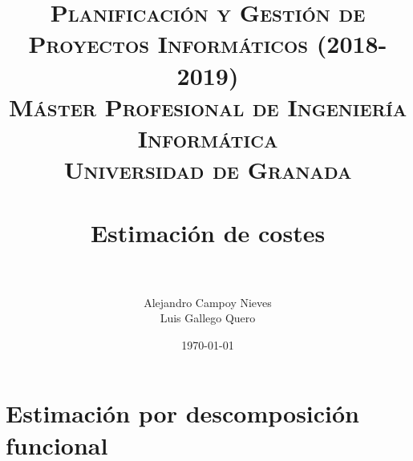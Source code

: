 


\title{	
	\normalfont \normalsize 
	\textsc{\textbf{Planificación y Gestión de Proyectos Informáticos (2018-2019)} \\ Máster Profesional de Ingeniería Informática \\ Universidad de Granada} \\ [25pt] %
	\horrule{0.5pt} \\[0.4cm] %
	\huge Estimación de costes \\ %
	\horrule{2pt} \\[0.5cm] %
}

\author{Alejandro Campoy Nieves \\ Luis Gallego Quero} %
\date{\normalsize\today} %
\usepackage{graphicx}
\usepackage{hyperref} %
\usepackage{eurosym} %




\maketitle %

\newpage %

\tableofcontents %

\listoffigures

\listoftables	

\newpage		
 
\section{Estimación por descomposición funcional}

